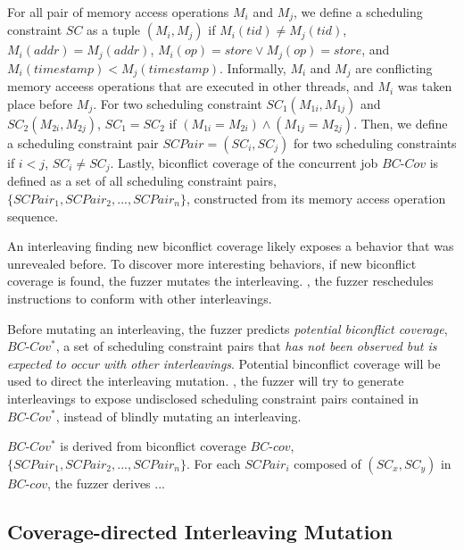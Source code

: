For all pair of memory access operations $M_i$ and $M_j$, we define a
scheduling constraint $SC$ as a tuple $(M_i, M_j)$ if
$M_i(tid) \neq M_j(tid)$, $M_i(addr) = M_j(addr)$,
$M_i(op) = store \vee M_j(op) = store$, and
$M_i(timestamp) < M_j(timestamp)$.
%
Informally, $M_i$ and $M_j$ are conflicting memory acceess operations
that are executed in other threads, and $M_i$ was taken place before
$M_j$.
%
For two scheduling constraint $SC_1(M_{1i}, M_{1j})$ and
$SC_2(M_{2i}, M_{2j})$, $SC_1 = SC_2$ if
$(M_{1i} = M_{2i}) \wedge (M_{1j} = M_{2j})$.
%
Then, we define a scheduling constraint pair $SCPair = (SC_i, SC_j)$
for two scheduling constraints if $i < j$, $SC_i \neq SC_j$.
%
Lastly, biconflict coverage of the concurrent job $BC\mbox{-}Cov$ is
defined as a set of all scheduling constraint pairs,
$\{SCPair_1, SCPair_2, ..., SCPair_n\}$, constructed from its memory
access operation sequence.



%
An interleaving finding new biconflict coverage likely exposes a
behavior that was unrevealed before.
%
To discover more interesting behaviors, if new biconflict coverage is
found, the fuzzer mutates the interleaving. \ie, the fuzzer
reschedules instructions to conform with other interleavings.

Before mutating an interleaving, the fuzzer predicts \textit{potential
  biconflict coverage}, $BC\mbox{-}Cov^*$, a set of scheduling
constraint pairs that \textit{has not been observed but is expected to
  occur with other interleavings}.
%
Potential binconflict coverage will be used to direct the interleaving
mutation. \ie, the fuzzer will try to generate interleavings to expose
undisclosed scheduling constraint pairs contained in
$BC\mbox{-}Cov^*$, instead of blindly mutating an interleaving.


$BC\mbox{-}Cov^*$ is derived from biconflict coverage $BC\mbox{-}cov$,
$\{SCPair_1, SCPair_2, ..., SCPair_n\}$.
%
For each $SCPair_i$ composed of $(SC_x, SC_y)$ in $BC\mbox{-}cov$, the
fuzzer derives ...



\subsection{Coverage-directed Interleaving Mutation}
\label{ss:scheduler}

